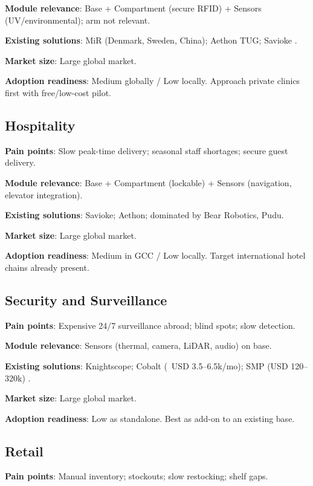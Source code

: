 \textbf{Module relevance}: Base + Compartment (secure RFID) + Sensors (UV/environmental); arm not relevant.

\textbf{Existing solutions}: MiR (Denmark, Sweden, China); Aethon TUG; Savioke \cite{mir_healthcare,researchgate_hospital}.

\textbf{Market size}: Large global market.

\textbf{Adoption readiness}: Medium globally / Low locally. Approach private clinics first with free/low-cost pilot.

\subsection{Hospitality}

\textbf{Pain points}: Slow peak-time delivery; seasonal staff shortages; secure guest delivery.

\textbf{Module relevance}: Base + Compartment (lockable) + Sensors (navigation, elevator integration).

\textbf{Existing solutions}: Savioke; Aethon; dominated by Bear Robotics, Pudu.

\textbf{Market size}: Large global market.

\textbf{Adoption readiness}: Medium in GCC / Low locally. Target international hotel chains already present.

\subsection{Security and Surveillance}

\textbf{Pain points}: Expensive 24/7 surveillance abroad; blind spots; slow detection.

\textbf{Module relevance}: Sensors (thermal, camera, LiDAR, audio) on base.

\textbf{Existing solutions}: Knightscope; Cobalt (~USD 3.5--6.5k/mo); SMP (USD 120--320k) \cite{mordor_security,coherent_security}.

\textbf{Market size}: Large global market.

\textbf{Adoption readiness}: Low as standalone. Best as add-on to an existing base.

\subsection{Retail}

\textbf{Pain points}: Manual inventory; stockouts; slow restocking; shelf gaps.

